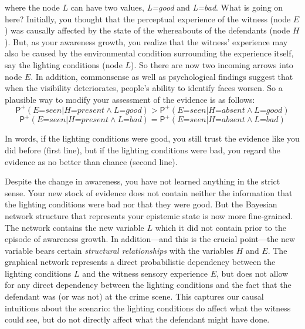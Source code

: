 \documentclass[
  11pt,
  dvipsnames,enabledeprecatedfontcommands, todos]{scrartcl}
\newcommand{\ppr}[2]{\ensuremath{\mathsf{P}^{#1}(#2)}}
\begin{document}
\noindent where the node \(L\) can have two values, \textit{L=good} and
\textit{L=bad}. What is going on here? Initially, you thought that the
perceptual experience of the witness (node \(E\)) was causally affected
by the state of the whereabouts of the defendants (node \(H\)). But, as
your awareness growth, you realize that the witness' experience may also
be caused by the environmental condition surrounding the experience
itself, say the lighting conditions (node \(L\)). So there are now two
incoming arrows into node \(E\). In addition, commonsense as well as
psychological findings suggest that when the visibility deteriorates,
people's ability to identify faces worsen. So a plausible way to modify
your assessment of the evidence is as follows:
\[\ppr{+}{\textit{E=seen} \vert \textit{H=present} \wedge \textit{L=good}} > \ppr{+}{\textit{E=seen} \vert \textit{H=absent} \wedge \textit{L=good}}\]
\[\ppr{+}{\textit{E=seen} \vert \textit{H=present} \wedge \textit{L=bad}} = \ppr{+}{\textit{E=seen} \vert \textit{H=absent} \wedge \textit{L=bad}}\]

\noindent In words, if the lighting conditions were good, you still
trust the evidence like you did before (first line), but if the lighting
conditions were bad, you regard the evidence as no better than chance
(second line).

Despite the change in awareness, you have not learned anything in the
strict sense. Your new stock of evidence does not contain neither the
information that the lighting conditions were bad nor that they were
good. But the Bayesian network structure that represents your epistemic
state is now more fine-grained. The network contains the new variable
\(L\) which it did not contain prior to the episode of awareness growth.
In addition---and this is the crucial point---the new variable bears
certain \emph{structural relationships} with the variables \(H\) and
\(E\). The graphical network represents a direct probabilistic
dependency between the lighting conditions \(L\) and the witness sensory
experience \(E\), but does not allow for any direct dependency between
the lighting conditions and the fact that the defendant was (or was not)
at the crime scene. This captures our causal intuitions about the
scenario: the lighting conditions do affect what the witness could see,
but do not directly affect what the defendant might have done.
\end{document}
